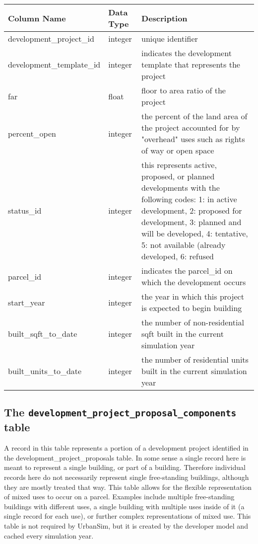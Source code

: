 \begin{tabular}{p{2in}lp{3.5in}}
\textbf{Column Name} & \textbf{Data Type} & \textbf{Description} \\
\hline
development\_project\_id & integer & unique identifier \\ \hline
development\_template\_id & integer & indicates the development template that represents the project\\ \hline
far & float & floor to area ratio of the project\\ \hline
percent\_open & integer & the percent of the land area of the project accounted for by "overhead" uses such as rights of way or open space\\ \hline
status\_id & integer & this represents active, proposed, or planned developments with the following codes: 
1: in active development, 2: proposed for development, 3: planned and will be developed, 4: tentative, 
5: not available (already developed, 6: refused\\ \hline
parcel\_id & integer & indicates the parcel\_id on which the development occurs\\ \hline
start\_year & integer &  the year in which this project is expected to begin building\\ \hline
built\_sqft\_to\_date & integer & the number of non-residential sqft built in the current simulation year\\ \hline
built\_units\_to\_date & integer & the number of residential units built in the current simulation year \\ \hline
\end{tabular}


\subsection{The {\tt development\_project\_proposal\_components} table}
\label{sec:db-tables-development-project-proposal-components}

A record in this table represents a portion of a development project identified in the development\_project\_proposals table. 
In some sense a single record here is meant to represent a single building, or part of a building. 
Therefore individual records here do not necessarily represent single free-standing buildings, 
although they are mostly treated that way. This table allows for the flexible representation of mixed uses to occur on a parcel. 
Examples include multiple free-standing buildings with different uses, a single building with multiple uses inside of it 
(a single record for each use), or further complex representations of mixed use. This table is not required 
by UrbanSim, but it is created by the developer model and cached every simulation year. 


